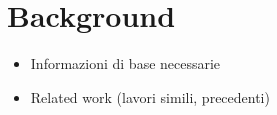 \chapter{Background}

\begin{itemize}
	\item Informazioni di base necessarie
	\item Related work (lavori simili, precedenti)
\end{itemize}
